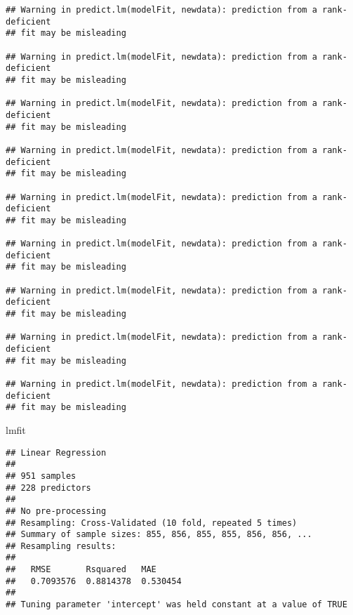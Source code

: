 \documentclass[]{article}
\newenvironment{Shaded}{\begin{snugshade}}{\end{snugshade}}
\newcommand{\CommentTok}[1]{\textcolor[rgb]{0.56,0.35,0.01}{\textit{#1}}}
\newcommand{\KeywordTok}[1]{\textcolor[rgb]{0.13,0.29,0.53}{\textbf{#1}}}
\newcommand{\NormalTok}[1]{#1}
\newcommand{\OperatorTok}[1]{\textcolor[rgb]{0.81,0.36,0.00}{\textbf{#1}}}
\newcommand{\StringTok}[1]{\textcolor[rgb]{0.31,0.60,0.02}{#1}}
\begin{document}
\begin{verbatim}
## Warning in predict.lm(modelFit, newdata): prediction from a rank-deficient
## fit may be misleading

## Warning in predict.lm(modelFit, newdata): prediction from a rank-deficient
## fit may be misleading

## Warning in predict.lm(modelFit, newdata): prediction from a rank-deficient
## fit may be misleading

## Warning in predict.lm(modelFit, newdata): prediction from a rank-deficient
## fit may be misleading

## Warning in predict.lm(modelFit, newdata): prediction from a rank-deficient
## fit may be misleading

## Warning in predict.lm(modelFit, newdata): prediction from a rank-deficient
## fit may be misleading

## Warning in predict.lm(modelFit, newdata): prediction from a rank-deficient
## fit may be misleading

## Warning in predict.lm(modelFit, newdata): prediction from a rank-deficient
## fit may be misleading

## Warning in predict.lm(modelFit, newdata): prediction from a rank-deficient
## fit may be misleading
\end{verbatim}

\begin{Shaded}
\begin{Highlighting}[]
\NormalTok{lmfit}
\end{Highlighting}
\end{Shaded}

\begin{verbatim}
## Linear Regression 
## 
## 951 samples
## 228 predictors
## 
## No pre-processing
## Resampling: Cross-Validated (10 fold, repeated 5 times) 
## Summary of sample sizes: 855, 856, 855, 855, 856, 856, ... 
## Resampling results:
## 
##   RMSE       Rsquared   MAE     
##   0.7093576  0.8814378  0.530454
## 
## Tuning parameter 'intercept' was held constant at a value of TRUE
\end{verbatim}

\begin{Shaded}
\end{Shaded}
\end{document}
